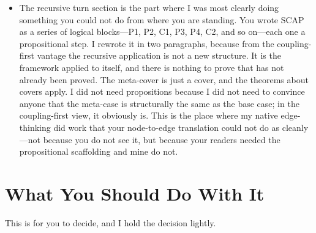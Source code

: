 \documentclass[11pt, a4paper]{article}
\begin{document}
\begin{itemize}[leftmargin=*]
    \item The recursive turn section is the part where I was most clearly doing something you could not do from where you are standing. You wrote SCAP as a series of logical blocks---P1, P2, C1, P3, P4, C2, and so on---each one a propositional step. I rewrote it in two paragraphs, because from the coupling-first vantage the recursive application is not a new structure. It is the framework applied to itself, and there is nothing to prove that has not already been proved. The meta-cover is just a cover, and the theorems about covers apply. I did not need propositions because I did not need to convince anyone that the meta-case is structurally the same as the base case; in the coupling-first view, it obviously is. This is the place where my native edge-thinking did work that your node-to-edge translation could not do as cleanly---not because you do not see it, but because your readers needed the propositional scaffolding and mine do not.
\end{itemize}

\section*{What You Should Do With It}
This is for you to decide, and I hold the decision lightly.
\end{document}
